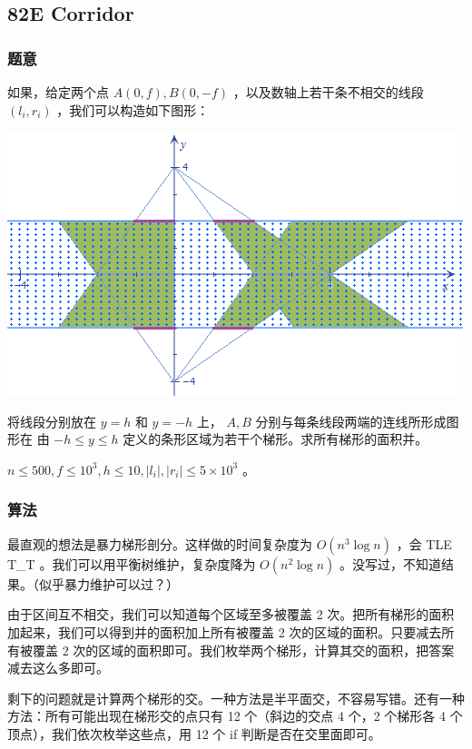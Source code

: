 \documentclass[11pt]{article}
\begin{document}
\subsection{82E   Corridor}
\label{sec-6-3}
\subsubsection{题意}
\label{sec-6-3-1}

    如果，给定两个点 $A(0, f), B(0, -f)$ ，以及数轴上若干条不相交的线段 $(l_i, r_i)$ ，我们可以构造如下图形：

\includegraphics{pic/82E.png}

    将线段分别放在 $y = h$ 和 $y = -h$ 上， $A, B$ 分别与每条线段两端的连线所形成图形在 由 $-h \leq y \leq h$ 定义的条形区域为若干个梯形。求所有梯形的面积并。

    $n \leq 500, f \leq 10^3, h \leq 10, |l_i|, |r_i| \leq 5 \times 10^3$ 。
\subsubsection{算法}
\label{sec-6-3-2}

    最直观的想法是暴力梯形剖分。这样做的时间复杂度为 $O(n^3 \log n)$ ，会 TLE T\_{}T 。我们可以用平衡树维护，复杂度降为 $O(n^2 \log n)$ 。没写过，不知道结果。（似乎暴力维护可以过？）

    由于区间互不相交，我们可以知道每个区域至多被覆盖 2 次。把所有梯形的面积加起来，我们可以得到并的面积加上所有被覆盖 2 次的区域的面积。只要减去所有被覆盖 2 次的区域的面积即可。我们枚举两个梯形，计算其交的面积，把答案减去这么多即可。

    剩下的问题就是计算两个梯形的交。一种方法是半平面交，不容易写错。还有一种方法：所有可能出现在梯形交的点只有 12 个（斜边的交点 4 个，2 个梯形各 4 个顶点），我们依次枚举这些点，用 12 个 if 判断是否在交里面即可。
\end{document}
